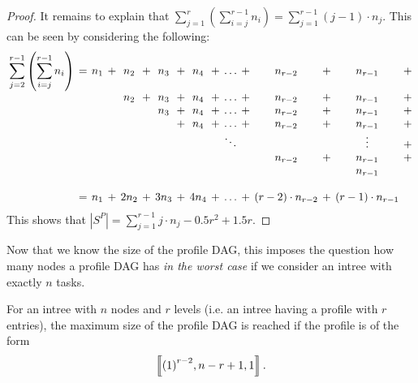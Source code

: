 \begin{proof}
  It remains to explain that $\sum _{j=1}^{r} \left( \sum _{i=j}^{r-1}n_{{i}} \right) = \sum_{j=1}^{r-1}(j-1)\cdot n_j$. This can be seen by considering the following:
  \begin{eqnarray*}
    \setlength{\arraycolsep}{2pt}
    \begin{array}{cccccccccccccccc}
      \displaystyle
      \sum_{j=2}^{r-1} \left( \sum _{i=j}^{r-1}n_{{i}} \right) &=&
         n_1 & + & n_2 & + & n_3 & + & n_4 & + & \dots & + & n_{r-2} & + & n_{r-1}  & + \\
      & &    &   & n_2 & + & n_3 & + & n_4 & + & \dots & + & n_{r-2} & + & n_{r-1}  & + \\
      & &    &   &     &   & n_3 & + & n_4 & + & \dots & + & n_{r-2} & + & n_{r-1}  & + \\
      & &    &   &     &   &     & + & n_4 & + & \dots & + & n_{r-2} & + & n_{r-1}  & + \\
      & &    &   &     &   &     &  &  &  & \ddots &  &  &  & \vdots  & + \\
      & &    &   &     &   &     &   &     &   &   &   &  n_{r-2}  & +  & n_{r-1}  & +  \\
      & &    &   &     &   &     &   &     &   &   &   &    &   & n_{r-1}  &   \\
      \\
      &=& n_1 &+& 2 n_2 & + & 3 n_3 &+& 4 n_4 &+& \dots & + & (r-2)\cdot n_{r-2} &+& (r-1)\cdot n_{r-1} & \\
    \end{array}
  \end{eqnarray*}
  This shows that $\left|S^P\right| = \sum _{j=1}^{r-1} j \cdot n_j 
    -0.5r^2 + 1.5 r$.
\end{proof}

Now that we know the size of the profile DAG, this imposes the question how many nodes a profile DAG has \emph{in the worst case} if we consider an intree with exactly $n$ tasks.

\begin{lemma}
  \label{lem:profile-dags-form-of-maximum-profile}
  For an intree with $n$ nodes and $r$ levels (i.e. an intree having a profile with $r$ entries), the maximum size of the profile DAG is reached if the profile is of the form
  \begin{equation*}
    \left\llbracket {(1)}^{r-2},n-r+1,1 \right\rrbracket.
  \end{equation*}
\end{lemma}

